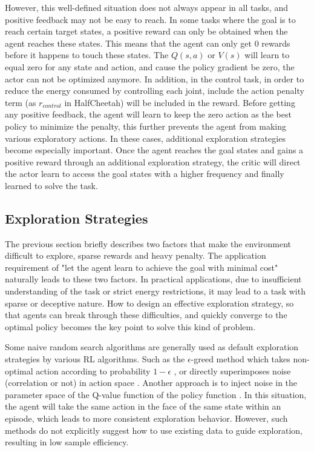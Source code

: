 However, this well-defined situation does not always appear in all tasks, and positive feedback may not be easy to reach. In some tasks where the goal is to reach certain target states, a positive reward can only be obtained when the agent reaches these states. This means that the agent can only get 0 rewards before it happens to touch these states. The $Q(s,a)$ or $V(s)$ will learn to equal zero for any state and action, and cause the policy gradient be zero, the actor can not be optimized anymore. In addition, in the control task, in order to reduce the energy consumed by controlling each joint, include the action penalty term (as $r_{control}$ in HalfCheetah) will be included in the reward. Before getting any positive feedback, the agent will learn to keep the zero action as the best policy to minimize the penalty, this further prevents the agent from making various exploratory actions. In these cases, additional exploration strategies become especially important. Once the agent reaches the goal states and gains a positive reward through an additional exploration strategy, the critic will direct the actor learn to access the goal states with a higher frequency and finally learned to solve the task.

\subsection{Exploration Strategies}
The previous section briefly describes two factors that make the environment difficult to explore, sparse rewards and heavy penalty. The application requirement of "let the agent learn to achieve the goal with minimal cost" naturally leads to these two factors. In practical applications, due to insufficient understanding of the task or strict energy restrictions, it may lead to a task with sparse or deceptive nature. How to design an effective exploration strategy, so that agents can break through these difficulties, and quickly converge to the optimal policy becomes the key point to solve this kind of problem.

Some naive random search algorithms are generally used as default exploration strategies by various RL algorithms. Such as the $\epsilon$-greed method which takes non-optimal action according to probability $1-\epsilon$ \cite{DQN}, or directly superimposes noise (correlation or not) in action space \cite{DDPG}. Another approach is to inject noise in the parameter space of the Q-value function of the policy function \cite{pnoise}. In this situation, the agent will take the same action in the face of the same state within an episode, which leads to more consistent exploration behavior. However, such methods do not explicitly suggest how to use existing data to guide exploration, resulting in low sample efficiency. 

